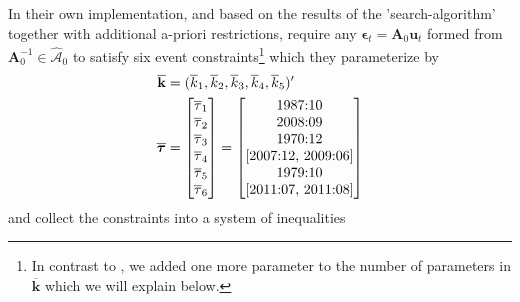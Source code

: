 \documentclass[a4paper,11pt,listof=nochaptergap,oneside,pointednumbers,bibtotoc,bigheadings,liststotoc,hidelinks]{scrbook}
\theoremstyle{mysatz}
\theoremstyle{mydefinition}
\theoremstyle{mytheorem}
\theoremstyle{mybemerkung}
\let\oldhat\hat
\newcommand{\vect}[1]{\boldsymbol{\mathbf{#1}}}
\newcommand{\hatt}[1]{\oldhat{\boldsymbol{\mathbf{#1}}}}
\begin{document}
In their own implementation, and based on the results of the 'search-algorithm' together with additional a-priori restrictions, \citet{ludvigsonetal:19} require any $\vect{\epsilon}_t = \vect{A}_0 \vect{u}_t$ formed from $\vect{A}_0^{-1} \in \hatt{\mathcal{A}}_0$ to satisfy six event constraints\footnote{In contrast to \citet{ludvigsonetal:19}, we added one more parameter to the number of parameters in $\overline{\vect{k}}$ which we will explain below.} which they parameterize by 
\begin{equation}
\begin{split}
\overline{\vect{k}} & = (\overline{k}_1, \overline{k}_2, \overline{k}_3, \overline{k}_4, \overline{k}_5)'\\
\overline{\vect{\tau}} & = \begin{bmatrix}
			\overline{\tau}_1 \\
			\overline{\tau}_2 \\
			\overline{\tau}_3 \\
			\overline{\tau}_4 \\
			\overline{\tau}_5 \\
			\overline{\tau}_6
			\end{bmatrix} = 
			\begin{bmatrix}
			$1987:10$ \\
			$2008:09$ \\
			$1970:12$ \\
			$[2007:12, 2009:06]$ \\
			$1979:10$ \\
			$[2011:07, 2011:08]$
			\end{bmatrix}
\end{split}
\end{equation}
and collect the constraints into a system of inequalities
\end{document}
